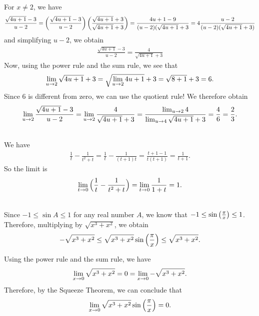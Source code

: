 	For $x \neq 2$, we have
		\begin{align*}
		\frac{\sqrt{4u + 1} - 3}{u - 2} = \left( \frac{\sqrt{4u + 1} - 3}{u - 2} \right) \left( \frac{\sqrt{4u + 1} + 3}{\sqrt{4u + 1} + 3} \right) = \frac{4u + 1 - 9}{(u - 2) (\sqrt{4u + 1} + 3} = 4 \frac{u - 2}{(u - 2) (\sqrt{4u + 1} + 3)}
		\end{align*}
	and simplifying $u - 2$, we obtain
		\begin{align*}
		\frac{\sqrt{4u + 1} - 3}{u - 2} = \frac{4}{\sqrt{4u + 1} + 3}
		\end{align*}
	Now, using the power rule and the sum rule, we see that
		\begin{align*}
		\lim_{u \rightarrow 2} \sqrt{4u + 1} + 3 = \sqrt{\lim_{u \rightarrow 2} 4u + 1} + 3 = \sqrt{8 + 1} + 3 = 6 .
		\end{align*}
	Since $6$ is different from zero, we can use the quotient rule! We therefore obtain
		\begin{align*}
		\lim_{u \rightarrow 2} \frac{\sqrt{4u + 1} - 3}{u - 2} = \lim_{u \rightarrow 2} \frac{4}{\sqrt{4u + 1} + 3} = \frac{\lim_{u \rightarrow 2} 4}{\lim_{u \rightarrow 4} \sqrt{4u + 1} + 3} = \frac{4}{6} = \frac{2}{3} .
		\end{align*}
		
	\spc
	
	\\
	We have
		\begin{align*}
		\frac{1}{t} - \frac{1}{t^2 + t} = \frac{1}{t} - \frac{1}{(t + 1)t} = \frac{t + 1 - 1}{t (t + 1)} = \frac{1}{t + 1} .
		\end{align*}
	So the limit is
		\begin{align*}
		\lim_{t \rightarrow 0} \Big( \frac{1}{t} - \frac{1}{t^2 + t} \Big) = \lim_{t \rightarrow 0} \frac{1}{1 + t} = 1 .
		\end{align*}
	
	\spc
	
	\\
	Since $-1 \leq \sin A \leq 1$ for any real number $A$, we know that $-1 \leq \sin \left( \frac{\pi}{x} \right) \leq 1$. Therefore, multiplying by $\sqrt{x^3 + x^2}$, we obtain
		\begin{align*}
		- \sqrt{x^3 + x^2} \leq \sqrt{x^3 + x^2} \sin \left( \frac{\pi}{x} \right) \leq \sqrt{x^3 + x^2} .
		\end{align*}
	
	Using the power rule and the sum rule, we have
		\begin{align*}
		\lim_{x \rightarrow 0} \sqrt{x^3 + x^2} = 0 = \lim_{x \rightarrow 0} - \sqrt{x^3 + x^2} .
		\end{align*}
	Therefore, by the Squeeze Theorem, we can conclude that
		\begin{align*}
		\lim_{x \rightarrow 0} \sqrt{x^3 + x^2} \sin \left( \frac{\pi}{x} \right) = 0 .
		\end{align*}
		
